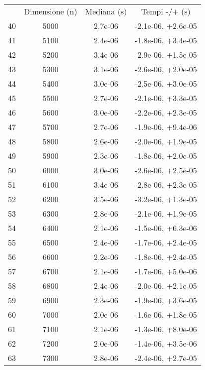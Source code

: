 \begin{table}
\centering
\begin{adjustbox}{width=1\textwidth/2}
\begin{tabular}{|c|c|c|c|}
\hline
 & Dimensione (n) & Mediana (s) & Tempi -/+ (s) \\
40 & 5000 & 2.7e-06 & -2.1e-06, +2.6e-05 \\
\cline{1-4}
41 & 5100 & 2.4e-06 & -1.8e-06, +3.4e-05 \\
\cline{1-4}
42 & 5200 & 3.4e-06 & -2.9e-06, +1.5e-05 \\
\cline{1-4}
43 & 5300 & 3.1e-06 & -2.6e-06, +2.0e-05 \\
\cline{1-4}
44 & 5400 & 3.0e-06 & -2.5e-06, +3.0e-05 \\
\cline{1-4}
45 & 5500 & 2.7e-06 & -2.1e-06, +3.3e-05 \\
\cline{1-4}
46 & 5600 & 3.0e-06 & -2.2e-06, +2.3e-05 \\
\cline{1-4}
47 & 5700 & 2.7e-06 & -1.9e-06, +9.4e-06 \\
\cline{1-4}
48 & 5800 & 2.6e-06 & -2.0e-06, +1.9e-05 \\
\cline{1-4}
49 & 5900 & 2.3e-06 & -1.8e-06, +2.0e-05 \\
\cline{1-4}
50 & 6000 & 3.0e-06 & -2.6e-06, +2.5e-05 \\
\cline{1-4}
51 & 6100 & 3.4e-06 & -2.8e-06, +2.3e-05 \\
\cline{1-4}
52 & 6200 & 3.5e-06 & -3.2e-06, +1.3e-05 \\
\cline{1-4}
53 & 6300 & 2.8e-06 & -2.1e-06, +1.9e-05 \\
\cline{1-4}
54 & 6400 & 2.1e-06 & -1.5e-06, +6.3e-06 \\
\cline{1-4}
55 & 6500 & 2.4e-06 & -1.7e-06, +2.4e-05 \\
\cline{1-4}
56 & 6600 & 2.2e-06 & -1.8e-06, +2.4e-05 \\
\cline{1-4}
57 & 6700 & 2.1e-06 & -1.7e-06, +5.0e-06 \\
\cline{1-4}
58 & 6800 & 2.4e-06 & -2.0e-06, +2.1e-05 \\
\cline{1-4}
59 & 6900 & 2.3e-06 & -1.9e-06, +3.6e-05 \\
\cline{1-4}
60 & 7000 & 2.0e-06 & -1.6e-06, +1.8e-05 \\
\cline{1-4}
61 & 7100 & 2.1e-06 & -1.3e-06, +8.0e-06 \\
\cline{1-4}
62 & 7200 & 2.0e-06 & -1.4e-06, +3.5e-06 \\
\cline{1-4}
63 & 7300 & 2.8e-06 & -2.4e-06, +2.7e-05 \\

\end{tabular}
\end{adjustbox}
\end{table}
